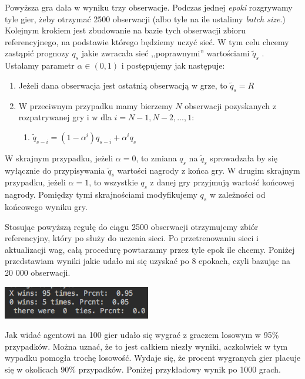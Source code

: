 \documentclass[licencjacka]{pracamgr}
\begin{document}
Powyższa gra dała w wyniku trzy obserwacje. Podczas jednej \textit{epoki} rozgrywamy tyle gier, żeby otrzymać 2500 obserwacji (albo tyle na ile ustalimy \textit{batch size}.) Kolejnym krokiem jest zbudowanie na bazie tych obserwacji zbioru referencyjnego, na podstawie którego będziemy uczyć sieć. W tym celu chcemy zastąpić prognozy $q_{s}$ jakie zwracała sieć ,,poprawnymi'' wartościami $\tilde{q}_{s}$ .  Ustalamy parametr $\alpha\in(0,1)$ i postępujemy jak następuje:


\begin{enumerate}
	\item{Jeżeli dana obserwacja jest ostatnią obserwacją w grze, to $\tilde{q}_{s}= R$}
	\item{W przeciwnym przypadku mamy bierzemy $N$ obserwacji pozyskanych z rozpatrywanej gry i w dla $i=N-1, N-2,...,1$: }
	\begin{enumerate}
		\item{$\tilde{q}_{s-i}= (1-\alpha^{i})q_{s-i} + \alpha^{i}q_{s} $}
	\end{enumerate}
\end{enumerate}
W skrajnym przypadku, jeżeli $\alpha=0$, to zmiana $q_{s}$ na $\tilde{q}_{s}$ sprowadzała by się wyłącznie do przypisywania $\tilde{q}_{s}$ wartości nagrody z końca gry. W drugim skrajnym przypadku, jeżeli $\alpha=1$, to wszystkie $q_{s}$ z danej gry przyjmują wartość końcowej nagrody. Pomiędzy tymi skrajnościami modyfikujemy $q_{s}$ w zależności od końcowego wyniku gry.  

Stosując powyższą regułę do ciągu 2500 obserwacji otrzymujemy zbiór referencyjny, który po służy do uczenia sieci. Po przetrenowaniu sieci i aktualizacji wag, całą procedurę powtarzamy przez tyle epok ile chcemy. Poniżej przedstawiam wyniki jakie udało mi się uzyskać po 8 epokach, czyli bazując na 20 000 obserwacji.

\begin{flushleft}
	\includegraphics [scale=0.7] {nn2_1.png}
\end{flushleft} 

Jak widać agentowi na 100 gier udało się wygrać z graczem losowym w 95\% przypadków.  Można uznać, że to jest całkiem niezły wyniki, aczkolwiek w tym wypadku pomogła trochę losowość. Wydaje się, że procent wygranych gier placuje się w okolicach 90\% przypadków. Poniżej przykładowy wynik po 1000 grach. 
\end{document}
